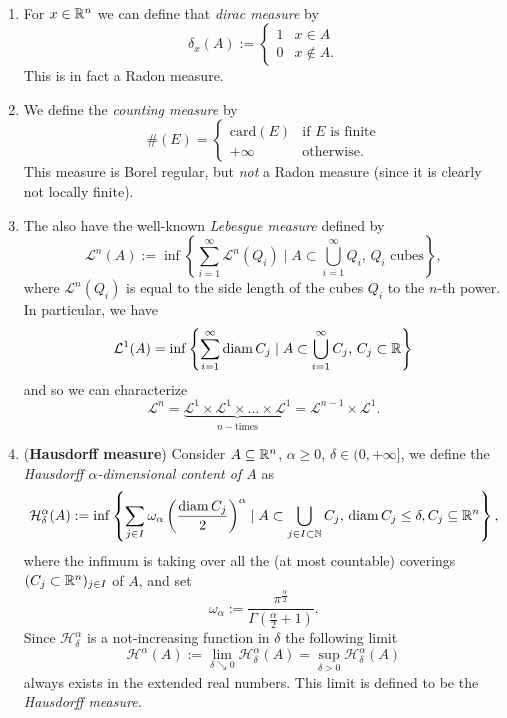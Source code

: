 \begin{examples}~
\begin{enumerate}[(1)]
\item For $x \in \mathbb{R}^n$ we can define that \emph{dirac measure} by  
\[
\delta_x(A) := 
\begin{cases}
1 & x \in A
\\
0 & x \not\in A.
\end{cases}
\]
This is in fact a Radon measure.
\item We define the \emph{counting measure} by
\[
\# (E) = 
\begin{cases}
\text{card}(E) & \text{if $E$ is finite}
\\
+\infty & \text{otherwise}.
\end{cases}
\]
This measure is Borel regular, but \emph{not} a Radon measure (since it is
clearly not locally finite).
\item The also have the well-known \emph{Lebesgue measure} defined by
\[
\mathcal{L}^n(A) := \inf \left\{\sum_{i=1}^\infty \mathcal{L}^n(Q_i) \mid A
\subset \bigcup_{i=1}^\infty Q_i,\, Q_i \text{ cubes}\right\},
\]
where $\mathcal{L}^n(Q_i)$ is equal to the side length of the cubes $Q_i$ to the
$n$-th power. In particular, we have
\[
\mathcal{L}^1(A) = \inf \left\{ \sum_{i=1}^\infty  \operatorname{diam} C_j \mid A
\subset \bigcup_{i=1}^\infty C_j, \, C_j \subset \mathbb{R} \right\}
\]
and so we can characterize
\[
\mathcal{L}^n = \underbrace{\mathcal{L}^1\times\mathcal{L}^1 \times \dots \times
\mathcal{L}^1}_{n-\text{times}} = \mathcal{L}^{n-1} \times \mathcal{L}^1.
\]
\item (\textbf{Hausdorff measure}) Consider $A \subseteq \mathbb{R}^n$, $\alpha \geq 0$, $\delta \in (0,+\infty]$, we
define the \emph{Hausdorff $\alpha$-dimensional content of $A$} as
\[
\mathcal{H}^\alpha_\delta(A) := \inf\left\{ \sum_{j\in I} \omega_\alpha
\left(\frac{\operatorname{diam} C_j}{2}\right)^\alpha \mid A \subset \bigcup_{j\in I \subset \mathbb{N}} C_j, \, \operatorname{diam}
C_j \leq \delta, C_j \subseteq \mathbb{R}^n \right\},
\]
where the infimum is taking over all the (at most countable) coverings $(C_j \subset
\mathbb{R}^n)_{j\in I}$ of $A$, and set $$\omega_\alpha :=
\frac{\pi^{\frac{\alpha}{2}}}{\Gamma(\frac{\alpha}{2}+1)}.$$ 
Since
$\mathcal{H}^\alpha_\delta$ is a not-increasing function in $\delta$ the
following limit
\[
\mathcal{H}^\alpha(A) := \lim_{\delta \searrow 0} \mathcal{H}^\alpha_\delta (A) =
\sup_{\delta > 0} \mathcal{H}^\alpha_\delta(A)
\]
always exists in the extended real numbers. This limit is defined to be the
\emph{Hausdorff measure}.
\end{enumerate}
\end{examples}

